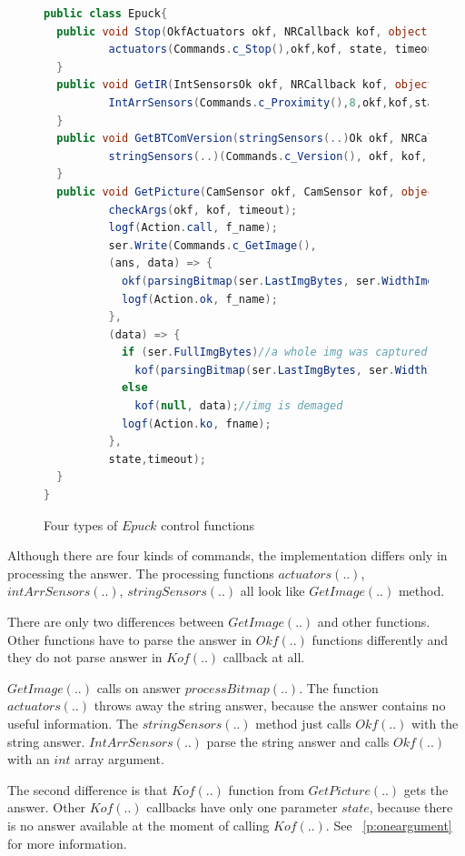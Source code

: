 \begin{figure}[!hbp]
\begin{lstlisting}[language=cs]
public class Epuck{
  public void Stop(OkfActuators okf, NRCallback kof, object state, double timeout) {
          actuators(Commands.c_Stop(),okf,kof, state, timeout, "Stop(..)");
  }
  public void GetIR(IntSensorsOk okf, NRCallback kof, object state, double timeout) {
          IntArrSensors(Commands.c_Proximity(),8,okf,kof,state,timeout,"GetIR(..)");
  }
  public void GetBTComVersion(stringSensors(..)Ok okf, NRCallback kof, object state, double timeout) {
          stringSensors(..)(Commands.c_Version(), okf, kof, state, timeout, "BTComVersion(..)");
  }
  public void GetPicture(CamSensor okf, CamSensor kof, object state, double timeout) {
          checkArgs(okf, kof, timeout);
          logf(Action.call, f_name);
          ser.Write(Commands.c_GetImage(),
          (ans, data) => {
            okf(parsingBitmap(ser.LastImgBytes, ser.WidthImg, ser.HeightImg, ser.ModeImg), data);
            logf(Action.ok, f_name);
          },
          (data) => {
            if (ser.FullImgBytes)//a whole img was captured
              kof(parsingBitmap(ser.LastImgBytes, ser.WidthImg, ser.HeightImg, ser.ModeImg), data);
            else
              kof(null, data);//img is demaged
            logf(Action.ko, fname);
          },
          state,timeout);		
  }	   
}
\end{lstlisting}
\caption{Four types of $Epuck$ control functions}
\label{publicep}	
\end{figure}

  Although there are four kinds of commands, the implementation differs only in processing the answer.
  The processing functions $actuators(..)$, $intArrSensors(..)$, $stringSensors(..)$ all 
  look like $GetImage(..)$ method.
  
  There are only two differences between $GetImage(..)$ and other functions.
  Other functions have to parse the answer in $Okf(..)$ functions differently and they do not parse
  answer in $Kof(..)$ callback at all.

  $GetImage(..)$ calls on answer $processBitmap(..)$.
  The function $actuators(..)$ throws away the string answer, because the answer contains no useful information.
  The $stringSensors(..)$ method just calls $Okf(..)$ with the string answer.
  $IntArrSensors(..)$ parse the string answer and calls $Okf(..)$ with an $int$ array argument.

  The second difference is that $Kof(..)$ function from $GetPicture(..)$ gets the answer. 
  Other $Kof(..)$ callbacks have only one parameter $state$, 
  because there is no answer available at the moment of calling $Kof(..)$.
  See ~\ref{p:oneargument} for more information.

